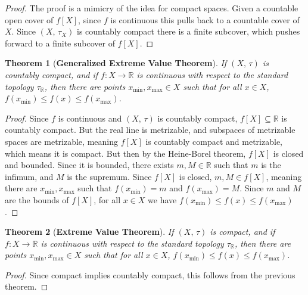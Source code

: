\documentclass{article}
\theoremstyle{plain}
\newtheorem{theorem}{Theorem}[section]
\theoremstyle{normal}
\begin{document}
        \begin{proof}
            The proof is a mimicry of the idea for compact spaces.
            Given a countable open cover of $f[X]$, since $f$ is continuous
            this pulls back to a countable cover of $X$. Since $(X,\,\tau_{X})$
            is countably compact there is a finite subcover, which pushes
            forward to a finite subcover of $f[X]$.
        \end{proof}
        \begin{theorem}[\textbf{Generalized Extreme Value Theorem}]
            If $(X,\,\tau)$ is countably compact,
            and if $f:X\rightarrow\mathbb{R}$ is
            continuous with respect to the standard topology
            $\tau_{\mathbb{R}}$, then there are points
            $x_{\textrm{min}},x_{\textrm{max}}\in{X}$ such that for all
            $x\in{X}$, $f(x_{\textrm{min}})\leq{f}(x)\leq{f}(x_{\textrm{max}})$.
        \end{theorem}
        \begin{proof}
            Since $f$ is continuous and $(X,\,\tau)$ is countably compact,
            $f[X]\subseteq\mathbb{R}$ is countably compact. But the real line
            is metrizable, and subspaces of metrizable spaces are metrizable,
            meaning $f[X]$ is countably compact and metrizable, which means it
            is compact. But then by the Heine-Borel
            theorem, $f[X]$ is closed and bounded. Since it is bounded, there
            exists $m,M\in\mathbb{R}$ such that $m$ is the infimum, and
            $M$ is the supremum. Since $f[X]$ is closed, $m,M\in{f}[X]$, meaning
            there are $x_{\textrm{min}},x_{\textrm{max}}$ such that
            $f(x_{\textrm{min}})=m$ and $f(x_{\textrm{max}})=M$. Since
            $m$ and $M$ are the bounds of $f[X]$, for all
            $x\in{X}$ we have
            $f(x_{\textrm{min}})\leq{f}(x)\leq{f}(x_{\textrm{max}})$.
        \end{proof}
        \begin{theorem}[\textbf{Extreme Value Theorem}]
            If $(X,\,\tau)$ is compact,
            and if $f:X\rightarrow\mathbb{R}$ is
            continuous with respect to the standard topology
            $\tau_{\mathbb{R}}$, then there are points
            $x_{\textrm{min}},x_{\textrm{max}}\in{X}$ such that for all
            $x\in{X}$, $f(x_{\textrm{min}})\leq{f}(x)\leq{f}(x_{\textrm{max}})$.
        \end{theorem}
        \begin{proof}
            Since compact implies countably compact, this follows from the
            previous theorem.
        \end{proof}
\end{document}
